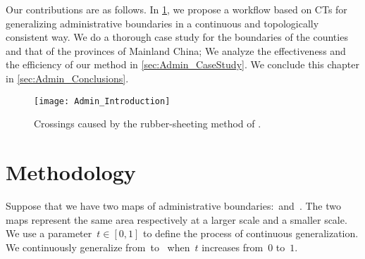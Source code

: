 
Our contributions are as follows.
In \sect\ref{sec:Admin_OverallAlgorithm},
we propose a workflow based on CTs 
for generalizing administrative boundaries 
in a continuous and topologically consistent way. 
We do a thorough case study for the boundaries of 
the counties and that of the provinces of Mainland China;  
We analyze the effectiveness and the efficiency of
our method in \sect\ref{sec:Admin_CaseStudy}.  
We conclude this chapter in \sect\ref{sec:Admin_Conclusions}.

\begin{figure}[tb]
	\centering
	\texttt{[image: Admin\_Introduction]}
	\caption{Crossings caused by the rubber-sheeting method of 
	\textcite{Doytsher2001}.}
	\label{fig:Admin_Rubbersheeting}
\end{figure}

\section{Methodology}
\label{sec:Admin_OverallAlgorithm}

Suppose that we have two maps  
of administrative boundaries:~\ml and~\ms.
The two maps represent the same area 
respectively at a larger scale and a smaller scale. 
We use a parameter~$t\in[0,1]$ 
to define the process of continuous generalization.
We continuously generalize from~\ml to~\ms
when~$t$ increases from~$0$ to~$1$.


